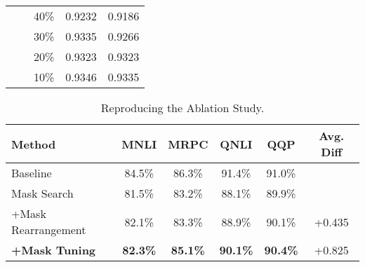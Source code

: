 \documentclass{article}
\begin{document}
\begin{table}[htbp]
\begin{tabular}{lcccc}
     &                         & 40\% & \cellcolor{lightgray}0.9232 & \cellcolor{darkgray}0.9186 \\
     &                         & 30\% & \cellcolor{lightgray}0.9335 & \cellcolor{darkgray}0.9266 \\
     &                         & 20\% & \cellcolor{lightgray}0.9323 & \cellcolor{darkgray}0.9323 \\
     &                         & 10\% & \cellcolor{lightgray}0.9346 & \cellcolor{darkgray}0.9335 \\
\bottomrule
\end{tabular}
\end{table}

\begin{table}[ht]
\centering
\caption{Reproducing the Ablation Study.}
\begin{tabular}{lcccc|c}
\toprule
Method & MNLI & MRPC & QNLI & QQP & Avg. Diff \\
\midrule
Baseline & 84.5\% & 86.3\% & 91.4\% & 91.0\% \\
\cmidrule(lr){1-5}
Mask Search & 81.5\% & 83.2\% & 88.1\% & 89.9\% \\
+Mask Rearrangement & 82.1\% & 83.3\% & 88.9\% & 90.1\% & +0.435 \\
\textbf{+Mask Tuning} & \textbf{82.3\%} & \textbf{85.1\%} & \textbf{90.1\%} & \textbf{90.4\%} & +0.825 \\
\bottomrule
\end{tabular}
\end{table}
\end{document}
